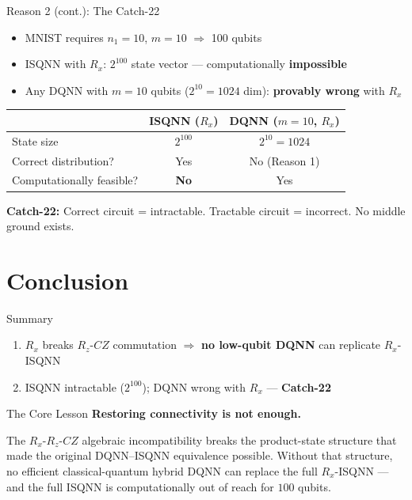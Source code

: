\documentclass[aspectratio=169]{beamer}
\begin{document}
\begin{frame}{Reason 2 (cont.): The Catch-22}
  \begin{itemize}
    \item MNIST requires $n_1=10$, $m=10$ $\Rightarrow$ 100 qubits
    \item ISQNN with $R_x$: $2^{100}$ state vector --- computationally \textbf{impossible}
    \item Any DQNN with $m=10$ qubits ($2^{10}=1024$ dim): \textbf{provably wrong} with $R_x$
  \end{itemize}

  \vspace{0.5em}
  \begin{center}
  \begin{tabular}{lcc}
    \toprule
    & ISQNN ($R_x$) & DQNN ($m=10$, $R_x$) \\
    \midrule
    State size & $2^{100}$ & $2^{10}=1024$ \\
    Correct distribution? & Yes & No (Reason 1) \\
    Computationally feasible? & \textbf{No} & Yes \\
    \bottomrule
  \end{tabular}
  \end{center}

  \vspace{0.5em}
  \textbf{Catch-22:} Correct circuit = intractable. Tractable circuit = incorrect. No middle ground exists.
\end{frame}

\section{Conclusion}

\begin{frame}{Summary}
  \begin{enumerate}
    \item $R_x$ breaks $R_z$-$CZ$ commutation $\Rightarrow$ \textbf{no low-qubit DQNN} can replicate $R_x$-ISQNN
    \item ISQNN intractable ($2^{100}$); DQNN wrong with $R_x$ --- \textbf{Catch-22}
  \end{enumerate}
\end{frame}

\begin{frame}{The Core Lesson}
  \centering
  \Large
  \textbf{Restoring connectivity is not enough.}

  \vspace{1em}
  \normalsize
  The $R_x$-$R_z$-$CZ$ algebraic incompatibility breaks the product-state structure that made the original DQNN--ISQNN equivalence possible. Without that structure, no efficient classical-quantum hybrid DQNN can replace the full $R_x$-ISQNN --- and the full ISQNN is computationally out of reach for $100$ qubits.
\end{frame}
\end{document}
